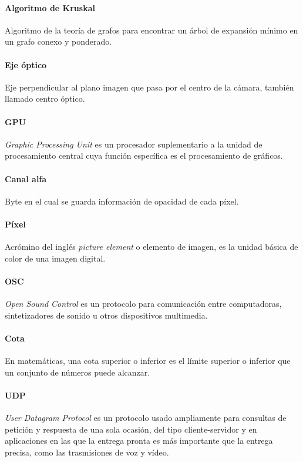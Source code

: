 \paragraph{Algoritmo de Kruskal}
Algoritmo de la teoría de grafos para encontrar un árbol de expansión mínimo en un grafo conexo y ponderado. 

\paragraph{Eje óptico}
Eje perpendicular al plano imagen que pasa por el centro de la cámara, también llamado centro óptico.

\paragraph{GPU}
\emph{Graphic Processing Unit} es un procesador suplementario a la unidad de procesamiento central cuya función específica es el procesamiento de gráficos.

\paragraph{Canal alfa}
Byte en el cual se guarda información de opacidad de cada píxel.

\paragraph{Píxel}
Acrómino del inglés \emph{picture element} o elemento de imagen, es la unidad básica de color de una imagen digital.

\paragraph{OSC}
\emph{Open Sound Control} es un protocolo para comunicación entre computadoras, sintetizadores de sonido u otros dispositivos multimedia.

\paragraph{Cota}
En matemáticas, una cota superior o inferior es el límite superior o inferior que un conjunto de números puede alcanzar.

\paragraph{UDP}
\emph{User Datagram Protocol} es un protocolo usado ampliamente para consultas de petición y respuesta de una sola ocasión, del tipo cliente-servidor y en aplicaciones en las que la entrega pronta es más importante que la entrega precisa, como las trasmisiones de voz y vídeo.